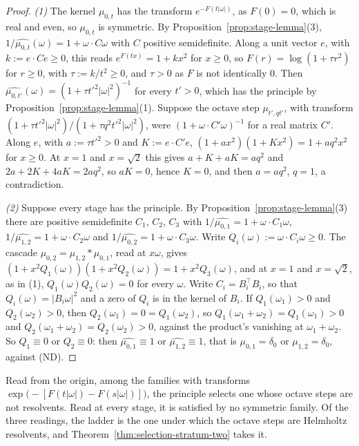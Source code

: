 \begin{proof}
\emph{(1)} The kernel $\mu_{0,t}$ has the transform $e^{-F(t|\omega|)}$, as $F(0) = 0$, which is
real and even, so $\mu_{0,t}$ is symmetric. By Proposition~\ref{prop:stage-lemma}(3),
$1/\widehat{\mu_{0,t}}(\omega) = 1 + \omega\cdot C\omega$ with $C$ positive semidefinite. Along a
unit vector $e$, with $k := e\cdot Ce \ge 0$, this reads $e^{F(tx)} = 1 + kx^2$ for $x \ge 0$, so
$F(r) = \log(1 + \tau r^2)$ for $r \ge 0$, with $\tau := k/t^2 \ge 0$, and $\tau > 0$ as $F$ is not
identically $0$. Then $\widehat{\mu_{0,t'}}(\omega) = (1 + \tau t'^2|\omega|^2)^{-1}$ for every
$t' > 0$, which has the principle by Proposition~\ref{prop:stage-lemma}(1). Suppose the octave
step $\mu_{t',qt'}$, with transform $(1 + \tau t'^2|\omega|^2)/(1 + \tau q^2t'^2|\omega|^2)$, were
$(1 + \omega\cdot C'\omega)^{-1}$ for a real matrix $C'$. Along $e$, with $a := \tau t'^2 > 0$ and
$K := e\cdot C'e$, $(1 + ax^2)(1 + Kx^2) = 1 + aq^2x^2$ for $x \ge 0$. At $x = 1$ and $x = \sqrt2$
this gives $a + K + aK = aq^2$ and $2a + 2K + 4aK = 2aq^2$, so $aK = 0$, hence $K = 0$, and then
$a = aq^2$, $q = 1$, a contradiction.

\emph{(2)} Suppose every stage has the principle. By Proposition~\ref{prop:stage-lemma}(3) there
are positive semidefinite $C_1$, $C_2$, $C_3$ with
$1/\widehat{\mu_{0,1}} = 1 + \omega\cdot C_1\omega$, $1/\widehat{\mu_{1,2}} = 1 + \omega\cdot
C_2\omega$ and $1/\widehat{\mu_{0,2}} = 1 + \omega\cdot C_3\omega$. Write
$Q_i(\omega) := \omega\cdot C_i\omega \ge 0$. The cascade $\mu_{0,2} = \mu_{1,2} * \mu_{0,1}$,
read at $x\omega$, gives $(1 + x^2Q_1(\omega))(1 + x^2Q_2(\omega)) = 1 + x^2Q_3(\omega)$, and at
$x = 1$ and $x = \sqrt2$, as in (1), $Q_1(\omega)Q_2(\omega) = 0$ for every $\omega$. Write
$C_i = B_i^\top B_i$, so that $Q_i(\omega) = |B_i\omega|^2$ and a zero of $Q_i$ is in the kernel of
$B_i$. If $Q_1(\omega_1) > 0$ and $Q_2(\omega_2) > 0$, then $Q_2(\omega_1) = 0 = Q_1(\omega_2)$, so
$Q_1(\omega_1 + \omega_2) = Q_1(\omega_1) > 0$ and $Q_2(\omega_1 + \omega_2) = Q_2(\omega_2) > 0$,
against the product's vanishing at $\omega_1 + \omega_2$. So $Q_1 \equiv 0$ or $Q_2 \equiv 0$: then
$\widehat{\mu_{0,1}} \equiv 1$ or $\widehat{\mu_{1,2}} \equiv 1$, that is $\mu_{0,1} = \delta_0$ or
$\mu_{1,2} = \delta_0$, against (ND).
\end{proof}

Read from the origin, among the families with transforms
$\exp\bigl(-[F(t|\omega|) - F(s|\omega|)]\bigr)$, the principle selects one whose octave steps are
not resolvents. Read at every stage, it is satisfied by no symmetric family. Of the three readings, the ladder is the one under which
the octave steps are Helmholtz resolvents, and Theorem~\ref{thm:selection-stratum-two} takes it.

